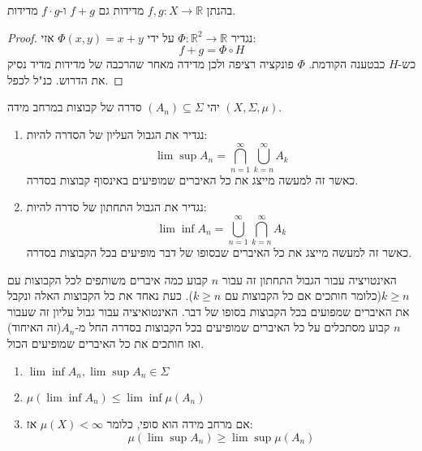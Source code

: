 \documentclass{tstextbook}
\begin{document}
\begin{corollary}
בהנתן \(f,g:X\to \mathbb{R}\) מדידות גם \(f+g\) ו-\(f\cdot g\) מדידות.

\end{corollary}
\begin{proof}
נגדיר \(\Phi:\mathbb{R}^{2}\to \mathbb{R}\) על ידי \(\Phi(x,y)=x+y\) אזי:
$$f+g=\Phi \circ  H$$
כש-\(H\) כבטענה הקודמת. \(\Phi\) פונקציה רציפה ולכן מדידה מאחר שהרכבה של מדידות מדיד נסיק את הדרוש. כנ"ל לכפל.

\end{proof}
\begin{definition}
יהי \((A_{n})\subseteq \Sigma\) סדרה של קבוצות במרחב מידה \(\left( X,\Sigma,\mu \right)\). 

  \begin{enumerate}
    \item נגדיר את הגבול העליון של הסדרה להיות: 
$$\operatorname*{lim}\operatorname*{sup}A_{n}=\bigcap_{n=1}^{\infty}\bigcup_{k=n}^{\infty}A_{k}$$
כאשר זה למעשה מייצג את כל האיברים שמופיעים באינסוף קבוצות בסדרה.


    \item נגדיר את הגבול התחתון של סדרה להיות: 
$$\operatorname*{lim}\operatorname*{inf}A_{n}=\bigcup_{n=1}^{\infty}\bigcap_{k=n}^{\infty}A_{k}$$
כאשר זה למעשה מייצג את כל האיברים שבסופו של דבר מופיעים בכל הקבוצות בסדרה.


  \end{enumerate}
\end{definition}
\begin{remark}
האינטויציה עבור הגבול התחתון זה עבור \(n\) קבוע כמה איברים משותפים לכל הקבוצות עם \(k\geq n\)(כלומר חותכים אם כל הקבוצות עם \(k\geq n\)). כעת נאחד את כל הקבוצות האלה ונקבל את האיברים שמפועים בכל הקבוצות בסופו של דבר. האינטואיציה עבור גבול עליון זה שעבור \(n\) קבוע מסתכלים על כל האיברים שמופיעים בכל הקבוצות בסדרה החל מ-\(A_{n}\)(זה האיחוד) ואז חותכים את כל האיברים שמופיעים הכול.

\end{remark}
\begin{proposition}
  \begin{enumerate}
    \item \(\operatorname*{lim}\operatorname*{inf}A_{n},\operatorname*{lim}\operatorname*{sup}A_{n}\in\Sigma\)


    \item \(\mu(\operatorname*{lim}\operatorname*{inf}A_{n})\leq\operatorname*{lim}\operatorname*{inf}\mu(A_{n})\)


    \item אם מרחב מידה הוא סופי, כלומר \(\mu(X)<\infty\) אז: 
$$\mu(\operatorname*{lim}\operatorname*{sup}A_{n})\geq\operatorname*{lim}\operatorname*{sup}\mu(A_{n})$$


  \end{enumerate}
\end{proposition}
\end{document}
